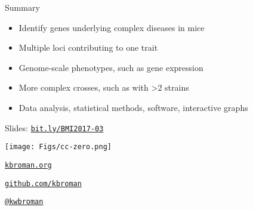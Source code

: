 \documentclass[12pt,t]{beamer}
\begin{document}
\begin{frame}[c]{Summary}

  \begin{itemize}
    \item Identify genes underlying complex diseases in mice
    \item Multiple loci contributing to one trait
    \item Genome-scale phenotypes, such as gene expression
    \item More complex crosses, such as with >2 strains
    \item Data analysis, statistical methods, software, interactive graphs
  \end{itemize}

\end{frame}

\begin{frame}[c]{}

\large

\vspace*{10mm}
Slides: \href{http://bit.ly/BMI2017-03}{\tt bit.ly/BMI2017-03}

\vspace*{-5mm}
\hspace{90mm} \texttt{[image: Figs/cc-zero.png]}

\vspace{2mm}

\href{http://kbroman.org}{\tt kbroman.org}

\vspace{2mm}

\href{https://github.com/kbroman}{\tt github.com/kbroman}

\vspace{2mm}

\href{https://twitter.com/kwbroman}{\tt @kwbroman}


\end{frame}
\end{document}
